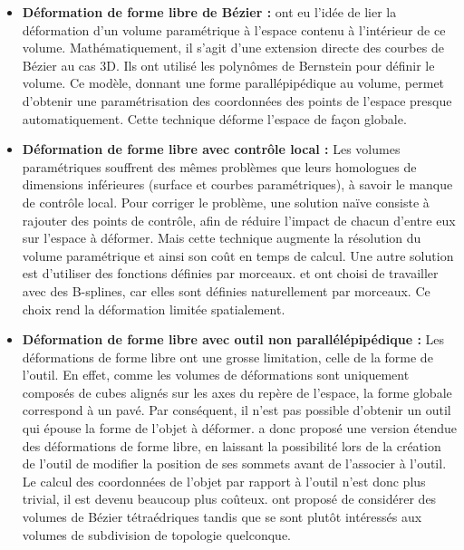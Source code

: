 \begin{itemize}

\item{\textbf{Déformation de forme libre de Bézier :}} \cite{SP86} ont   eu
l'idée de lier la déformation d'un volume paramétrique à l'espace   contenu à
l'intérieur de ce volume. Mathématiquement, il s'agit   d'une extension directe
des courbes de Bézier au cas 3D. Ils ont   utilisé les polynômes de Bernstein
pour définir le volume. Ce   modèle, donnant une forme parallépipédique au
volume, permet   d'obtenir une paramétrisation des coordonnées des points de
l'espace   presque automatiquement. Cette technique déforme l'espace de façon
globale.

\item{\textbf{Déformation de forme libre avec contrôle local :}} Les   volumes
paramétriques souffrent des mêmes problèmes que leurs   homologues de dimensions
inférieures (surface et courbes   paramétriques), à savoir le manque de contrôle
local. Pour corriger   le problème, une solution naïve consiste à rajouter des
points de   contrôle, afin de réduire l'impact de chacun d'entre eux sur
l'espace à déformer. Mais cette technique augmente la résolution du   volume
paramétrique et ainsi son coût en temps de calcul. Une autre   solution est
d'utiliser des fonctions définies par   morceaux. \cite{GP89} et \cite{Com89}
ont choisi de travailler avec   des B-splines, car elles sont définies
naturellement par   morceaux. Ce choix rend la déformation limitée spatialement.

\item{\textbf{Déformation de forme libre avec outil non       parallélépipédique
:}} Les déformations de forme libre ont une   grosse limitation, celle de la
forme de l'outil. En effet, comme les   volumes de déformations sont uniquement
composés de cubes alignés   sur les axes du repère de l'espace, la forme globale
correspond à un   pavé. Par conséquent, il n'est pas possible d'obtenir un outil
qui   épouse la forme de l'objet à déformer. \cite{Coq90} a donc proposé   une
version étendue des déformations de forme libre, en laissant la   possibilité
lors de la création de l'outil de modifier la position   de ses sommets avant de
l'associer à l'outil. Le calcul des   coordonnées de l'objet par rapport à
l'outil n'est donc plus   trivial, il est devenu beaucoup plus coûteux.
\cite{BBT97} ont   proposé de considérer des volumes de Bézier tétraédriques
tandis que   \cite{MJ96} se sont plutôt intéressés aux volumes de subdivision de
topologie quelconque.

\end{itemize}

